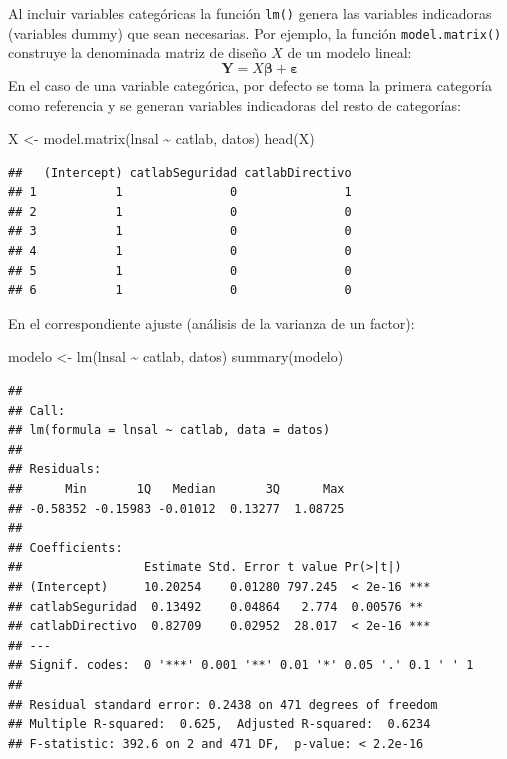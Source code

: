 \documentclass[
]{book}
\newenvironment{Shaded}{\begin{snugshade}}{\end{snugshade}}
\newcommand{\FunctionTok}[1]{\textcolor[rgb]{0.00,0.00,0.00}{#1}}
\newcommand{\NormalTok}[1]{#1}
\newcommand{\OtherTok}[1]{\textcolor[rgb]{0.56,0.35,0.01}{#1}}
\newcommand{\SpecialCharTok}[1]{\textcolor[rgb]{0.00,0.00,0.00}{#1}}
\theoremstyle{break}
\theoremstyle{nonumberplain}
\begin{document}
Al incluir variables categóricas la función \texttt{lm()} genera las variables indicadoras (variables dummy) que sean necesarias.
Por ejemplo, la función \texttt{model.matrix()} construye la denominada matriz de diseño \(X\) de un modelo lineal:
\[\mathbf{Y}=X\mathbf{\beta}+\mathbf{\varepsilon}\]
En el caso de una variable categórica, por defecto se toma la primera categoría como referencia y se generan variables indicadoras del resto de categorías:

\begin{Shaded}
\begin{Highlighting}[]
\NormalTok{X }\OtherTok{\textless{}{-}} \FunctionTok{model.matrix}\NormalTok{(lnsal }\SpecialCharTok{\textasciitilde{}}\NormalTok{ catlab, datos)}
\FunctionTok{head}\NormalTok{(X)}
\end{Highlighting}
\end{Shaded}

\begin{verbatim}
##   (Intercept) catlabSeguridad catlabDirectivo
## 1           1               0               1
## 2           1               0               0
## 3           1               0               0
## 4           1               0               0
## 5           1               0               0
## 6           1               0               0
\end{verbatim}

En el correspondiente ajuste (análisis de la varianza de un factor):

\begin{Shaded}
\begin{Highlighting}[]
\NormalTok{modelo }\OtherTok{\textless{}{-}} \FunctionTok{lm}\NormalTok{(lnsal }\SpecialCharTok{\textasciitilde{}}\NormalTok{ catlab, datos)}
\FunctionTok{summary}\NormalTok{(modelo)}
\end{Highlighting}
\end{Shaded}

\begin{verbatim}
## 
## Call:
## lm(formula = lnsal ~ catlab, data = datos)
## 
## Residuals:
##      Min       1Q   Median       3Q      Max 
## -0.58352 -0.15983 -0.01012  0.13277  1.08725 
## 
## Coefficients:
##                 Estimate Std. Error t value Pr(>|t|)    
## (Intercept)     10.20254    0.01280 797.245  < 2e-16 ***
## catlabSeguridad  0.13492    0.04864   2.774  0.00576 ** 
## catlabDirectivo  0.82709    0.02952  28.017  < 2e-16 ***
## ---
## Signif. codes:  0 '***' 0.001 '**' 0.01 '*' 0.05 '.' 0.1 ' ' 1
## 
## Residual standard error: 0.2438 on 471 degrees of freedom
## Multiple R-squared:  0.625,  Adjusted R-squared:  0.6234 
## F-statistic: 392.6 on 2 and 471 DF,  p-value: < 2.2e-16
\end{verbatim}
\end{document}
